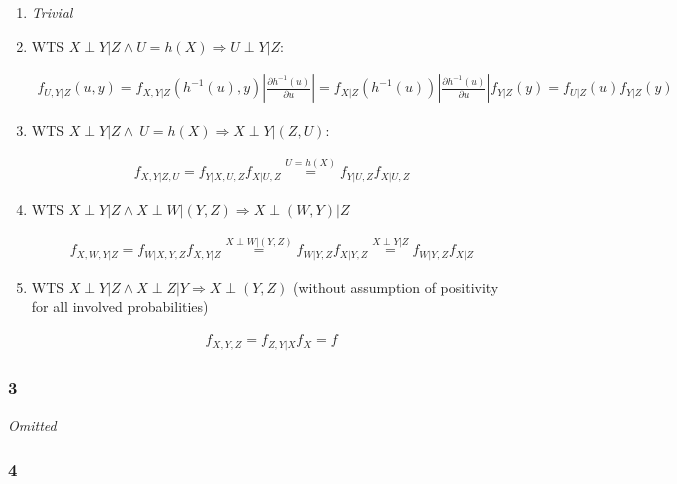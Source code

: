 \documentclass[11pt]{article}
\begin{document}
\begin{enumerate}[label=(\alph*)]
    \item \textit{Trivial} 
    
    \item WTS $X \perp Y|Z \land U=h(X) \Rightarrow U \perp Y | Z$:

    \begin{gather*}
        f_{U,Y|Z}(u,y) 
        =
        f_{X,Y|Z}(h^{-1}(u), y) \left| \frac{\partial h^{-1}(u)}{\partial u} \right|
        =
        f_{X|Z}(h^{-1}(u)) \left| \frac{\partial h^{-1}(u)}{\partial u} \right|
        f_{Y|Z}(y) 
        =
        f_{U|Z}(u)f_{Y|Z}(y)
    \end{gather*}
    

    \item 
    WTS $X\perp Y | Z \land \ U=h(X) \Rightarrow X \perp Y | (Z,U)$: 

    \begin{gather*}
    f_{X, Y | Z, U}
    =
    f_{Y|X, U, Z} f_{X|U, Z}
    \stackrel{U=h(X)}{=}
    f_{Y|U, Z} f_{X|U, Z}     
    \end{gather*}
    
    \item WTS $X \perp Y |Z \land X \perp W | (Y,Z) \Rightarrow X \perp (W,Y) | Z$

    \begin{gather*}
        f_{X, W, Y | Z} 
        =
        f_{W | X, Y, Z} f_{X, Y|Z}
        \stackrel{X \perp W | (Y, Z)}{=}
        f_{W | Y, Z} f_{X | Y, Z} 
        \stackrel{X \perp Y | Z}{=}
        f_{W | Y, Z} f_{X | Z} 
    \end{gather*}

    \item WTS $X \perp Y |Z \land X \perp Z |Y \Rightarrow X \perp (Y,Z)$ (without assumption of positivity for all involved probabilities)

    \begin{gather*}
        f_{X, Y, Z}
        =
        f_{Z, Y| X} f_X
        =
        f_{}
    \end{gather*}

\end{enumerate}

\subsubsection*{3}

\textit{Omitted}

\subsubsection*{4}
\end{document}
